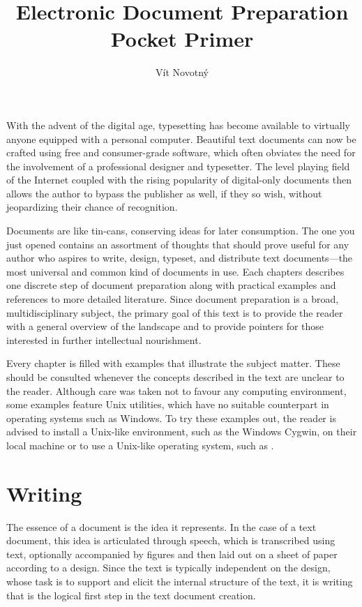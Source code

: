 \documentclass{book}
\begin{document}
\frontmatter
\title{Electronic Document Preparation\\Pocket Primer}
\author{Vít Novotný}
\maketitle
\tableofcontents
\mainmatter

With the advent of the digital age, typesetting has become available to
virtually anyone equipped with a personal computer. Beautiful text documents can
now be crafted using free and consumer-grade software, which often obviates the
need for the involvement of a professional designer and typesetter. The level
playing field of the Internet coupled with the rising popularity of digital-only
documents then allows the author to bypass the publisher as well, if they so
wish, without jeopardizing their chance of recognition.

Documents are like tin-cans, conserving ideas for later consumption. The one you
just opened contains an assortment of thoughts that should prove useful for any
author who aspires to write, design, typeset, and distribute text
documents---the most universal and common kind of documents in use. Each
chapters describes one discrete step of document preparation along with
practical examples and references to more detailed literature. Since document
preparation is a broad, multidisciplinary subject, the primary goal of this text
is to provide the reader with a general overview of the landscape and to provide
pointers for those interested in further intellectual nourishment.

Every chapter is filled with examples that illustrate the subject matter. These
should be consulted whenever the concepts described in the text are unclear to
the reader. Although care was taken not to favour any computing environment,
some examples feature Unix utilities, which have no suitable counterpart in
operating systems such as Windows. To try these examples out, the reader is
advised to install a Unix-like environment, such as the Windows Cygwin, on their
local machine or to use a Unix-like operating system, such as \Linux.

\chapter{Writing}
The essence of a document is the idea it represents. In the case of a text
document, this idea is articulated through speech, which is transcribed using
text, optionally accompanied by figures and then laid out on a sheet of paper
according to a design. Since the text is typically independent on the design,
whose task is to support and elicit the internal structure of the text, it is
writing that is the logical first step in the text document creation.
\end{document}
